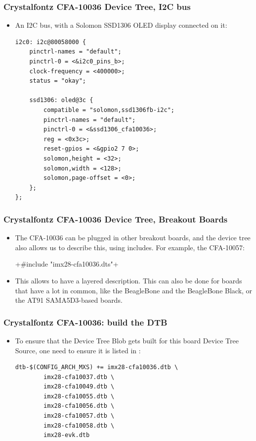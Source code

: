 \begin{frame}[fragile]
  \frametitle{Crystalfontz CFA-10036 Device Tree, I2C bus}
  \begin{itemize}
  \item An I2C bus, with a Solomon SSD1306 OLED display connected on
    it:
    \begin{block}{}
      \begin{verbatim}
i2c0: i2c@80058000 {
    pinctrl-names = "default";
    pinctrl-0 = <&i2c0_pins_b>;
    clock-frequency = <400000>;
    status = "okay";

    ssd1306: oled@3c {
        compatible = "solomon,ssd1306fb-i2c";
        pinctrl-names = "default";
        pinctrl-0 = <&ssd1306_cfa10036>;
        reg = <0x3c>;
        reset-gpios = <&gpio2 7 0>;
        solomon,height = <32>;
        solomon,width = <128>;
        solomon,page-offset = <0>;
    };
};
      \end{verbatim}
    \end{block}
  \end{itemize}
\end{frame}

\begin{frame}[fragile]
  \frametitle{Crystalfontz CFA-10036 Device Tree, Breakout Boards}
  \begin{itemize}
  \item The CFA-10036 can be plugged in other breakout boards, and the
    device tree also allows us to describe this, using includes. For
    example, the CFA-10057:
    \begin{block}{}
      +#include "imx28-cfa10036.dts"+
    \end{block}
  \item This allows to have a layered description. This can also be
    done for boards that have a lot in common, like the BeagleBone and
    the BeagleBone Black, or the AT91 SAMA5D3-based boards.
  \end{itemize}
\end{frame}

\begin{frame}[fragile]
  \frametitle{Crystalfontz CFA-10036: build the DTB}
  \begin{itemize}
  \item To ensure that the Device Tree Blob gets built for this board
    Device Tree Source, one need to ensure it is listed in
    :
    \begin{block}{}
      \begin{verbatim}
dtb-$(CONFIG_ARCH_MXS) += imx28-cfa10036.dtb \
        imx28-cfa10037.dtb \
        imx28-cfa10049.dtb \
        imx28-cfa10055.dtb \
        imx28-cfa10056.dtb \
        imx28-cfa10057.dtb \
        imx28-cfa10058.dtb \
        imx28-evk.dtb
      \end{verbatim}
    \end{block}
  \end{itemize}
\end{frame}

